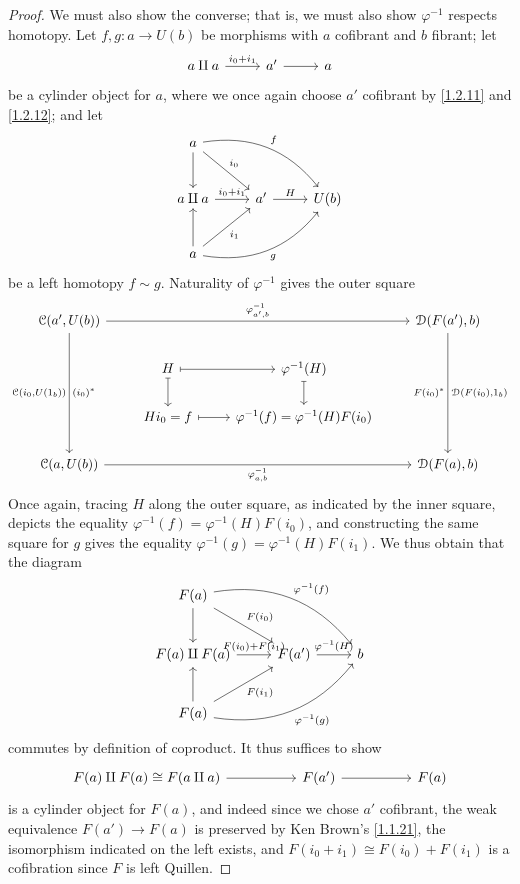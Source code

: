 \begin{proof}
	We must also show the converse; that is, we must also show $\varphi ^{-1} $ respects homotopy. Let $f,g : a \to U(b)$ be morphisms with $a$ cofibrant and $b$ fibrant; let
	\[\begin{tikzcd}[row sep = 2.5em, column sep = 2.5em]
	a\amalg a \ar[" i_0+i_1 ", r]  & a' \ar[r]  & a
	\end{tikzcd}\]
	be a cylinder object for $a$, where we once again choose $a'$ cofibrant by \cref{1.2.11} and \cref{1.2.12}; and let
	\[\begin{tikzcd}[row sep = 2.5em, column sep = 2.5em]
	a \ar[d] \ar[" i_0 ", dr] \ar[" f ", bend left, drr]  &  &  \\
	a\amalg a \ar[" i_0+i_1 ", r]  & a' \ar[" H ", r]  & U(b) \\
	a \ar[u] \ar[" i_1 "', ur] \ar[" g "', bend right, urr]  &  & 
	\end{tikzcd}\]
	be a left homotopy $f\sim g$. Naturality of $\varphi ^{-1} $ gives the outer square
	\[\begin{tikzcd}
	{\mathcal{C}(a',U(b))} &&& {\mathcal{D}(F(a'),b)} \\
	& H & {\varphi^{-1}(H)} \\
	& {Hi_0=f} & {\varphi^{-1}(f)=\varphi^{-1}(H)F(i_0)} \\
	{\mathcal{C}(a,U(b))} &&& {\mathcal{D}(F(a),b)}
	\arrow["{\varphi^{-1}_{a',b}}", from=1-1, to=1-4]
	\arrow["{\mathcal{C}(i_0,U(1_b))}"', " (i_0)^* ", from=1-1, to=4-1]
	\arrow["{\mathcal{D}(F(i_0),1_b)}", " F(i_0)^* "', from=1-4, to=4-4]
	\arrow[maps to, from=2-2, to=2-3]
	\arrow[maps to, from=2-2, to=3-2]
	\arrow[maps to, from=2-3, to=3-3]
	\arrow[maps to, from=3-2, to=3-3]
	\arrow["{\varphi^{-1}_{a,b}}"', from=4-1, to=4-4]
	\end{tikzcd}\]
	Once again, tracing $H$ along the outer square, as indicated by the inner square, depicts the equality $\varphi^{-1} (f)=\varphi^{-1} (H)F(i_0)$, and constructing the same square for $g$ gives the equality $\varphi^{-1} (g)=\varphi^{-1} (H)F(i_1)$. We thus obtain that the diagram
	\[\begin{tikzcd}[row sep = 2.5em, column sep = 2.5em]
	F(a)\ar[d] \ar[" F(i_0) ", dr] \ar[" \varphi ^{-1} (f)", bend left, drr]  &  &  \\
	F(a)\amalg F(a) \ar[" F(i_0)+F(i_1) ", r]  & F(a')\ar[" \varphi^{-1} (H)", r]  & b \\
	F(a)\ar[u] \ar[" F(i_1) "', ur] \ar[" \varphi ^{-1} (g)"', bend right, urr]  &  & 
	\end{tikzcd}\]
	commutes by definition of coproduct. It thus suffices to show
	\[\begin{tikzcd}[row sep = 2.5em, column sep = 5em]
	F(a)\amalg F(a)\cong F(a\amalg a)\ar[r]  & F(a')\ar[r]  & F(a)
	\end{tikzcd}\]
	is a cylinder object for $F(a)$, and indeed since we chose $a'$ cofibrant, the weak equivalence $F(a')\to F(a)$ is preserved by Ken Brown's \cref{1.1.21}, the isomorphism indicated on the left exists, and $F(i_0+i_1)\cong F(i_0)+F(i_1)$ is a cofibration since $F$ is left Quillen.
\end{proof}


